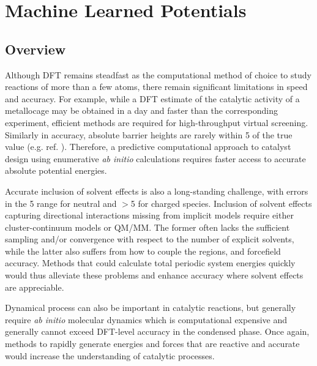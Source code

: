 \documentclass[../../main.tex]{subfiles}
\begin{document}
\setcounter{footnote}{0} 
\newcommand{\rom}[1]{\uppercase\expandafter{\romannumeral #1\relax}}


\chapter{Machine Learned Potentials}

\section{Overview}

Although DFT remains steadfast as the computational method of choice to study reactions of more than a few atoms,\cite{PribramJones2015} there remain significant limitations in speed and accuracy.\cite{Mardirossian2017} For example, while a DFT estimate of the catalytic activity of a metallocage may be obtained in a day\cite{Young2019} and faster than the corresponding experiment, efficient methods are required for high-throughput virtual screening. Similarly in accuracy, absolute barrier heights are rarely within 5 \kcalx of the true value (e.g. ref. \cite{Krongchon2017}). Therefore, a predictive computational approach to catalyst design using enumerative \emph{ab initio} calculations requires faster access to accurate absolute potential energies. 

Accurate inclusion of solvent effects is also a long-standing challenge, with errors in the 5 \kcalx range for neutral and
$>$5 \kcalx for charged species.\cite{Zhang2017} Inclusion of solvent effects capturing directional interactions missing from implicit models require either cluster-continuum models or QM/MM. The former often lacks the sufficient sampling and/or convergence with respect to the number of explicit solvents,\cite{Basdogan2018} while the latter also suffers from how to couple the regions, and forcefield accuracy.\cite{Thiel2009} Methods that could calculate total periodic system energies quickly would thus alleviate these problems and enhance accuracy where solvent effects are appreciable.

Dynamical process can also be important in catalytic reactions,\cite{Grajciar2018, Stirling2014} but generally require \emph{ab initio} molecular dynamics which is computational expensive and generally cannot exceed DFT-level accuracy in the condensed phase.\cite{Hassanali2014} Once again, methods to rapidly generate energies and forces that are reactive and accurate would increase the understanding of catalytic processes.
\end{document}
